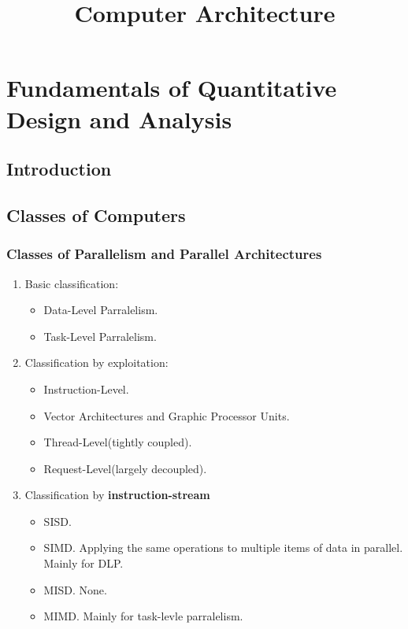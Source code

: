 \documentclass{article}
\title{Computer Architecture}
\begin{document}
\maketitle
\tableofcontents
\newpage

\section{Fundamentals of Quantitative Design and Analysis}
\subsection{Introduction}

\subsection{Classes of Computers}

\subsubsection*{Classes of Parallelism and Parallel Architectures}

\begin{enumerate}
\item Basic classification:
\begin{itemize}
    \item Data-Level Parralelism.
    \item Task-Level Parralelism.
\end{itemize}

\item Classification by exploitation:
\begin{itemize}
    \item Instruction-Level.
    \item Vector Architectures and Graphic Processor Units.
    \item Thread-Level(tightly coupled).
    \item Request-Level(largely decoupled).
\end{itemize}

\item Classification by \textbf{\color{orange} instruction-stream}
\begin{itemize}
    \item SISD.
    \item SIMD. Applying the same operations to multiple items of data in parallel. Mainly for DLP.
    \item MISD. None.
    \item MIMD. Mainly for task-levle parralelism.
\end{itemize}

\end{enumerate}
\end{document}
